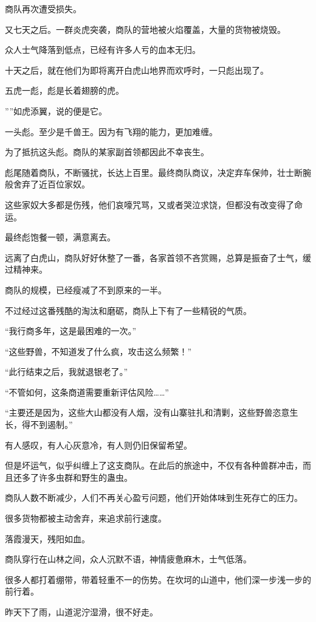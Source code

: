 \begin{this_body}
商队再次遭受损失。

又七天之后。一群炎虎突袭，商队的营地被火焰覆盖，大量的货物被烧毁。

众人士气降落到低点，已经有许多人亏的血本无归。

十天之后，就在他们为即将离开白虎山地界而欢呼时，一只彪出现了。

五虎一彪，彪是长着翅膀的虎。

””如虎添翼，说的便是它。

一头彪。至少是千兽王。因为有飞翔的能力，更加难缠。

为了抵抗这头彪。商队的某家副首领都因此不幸丧生。

彪尾随着商队，不断骚扰，长达上百里。最终商队商议，决定弃车保帅，壮士断腕般舍弃了近百位家奴。

这些家奴大多都是伤残，他们哀嚎咒骂，又或者哭泣求饶，但都没有改变得了命运。

最终彪饱餐一顿，满意离去。

远离了白虎山，商队好好休整了一番，各家首领不吝赏赐，总算是振奋了士气，缓过精神来。

商队的规模，已经瘦减了不到原来的一半。

不过经过这番残酷的淘汰和磨砺，商队上下有了一些精锐的气质。

“我行商多年，这是最困难的一次。”

“这些野兽，不知道发了什么疯，攻击这么频繁！”

“此行结束之后，我就退银老了。”

“不管如何，这条商道需要重新评估风险……”

“主要还是因为，这些大山都没有人烟，没有山寨驻扎和清剿，这些野兽恣意生长，得不到遏制。”

有人感叹，有人心灰意冷，有人则仍旧保留希望。

但是坏运气，似乎纠缠上了这支商队。在此后的旅途中，不仅有各种兽群冲击，而且还多了许多虫群和野生的蛊虫。

商队人数不断减少，人们不再关心盈亏问题，他们开始体味到生死存亡的压力。

很多货物都被主动舍弃，来追求前行速度。

落霞漫天，残阳如血。

商队穿行在山林之间，众人沉默不语，神情疲惫麻木，士气低落。

很多人都打着绷带，带着轻重不一的伤势。在坎坷的山道中，他们深一步浅一步的前行着。

昨天下了雨，山道泥泞湿滑，很不好走。


\end{this_body}
